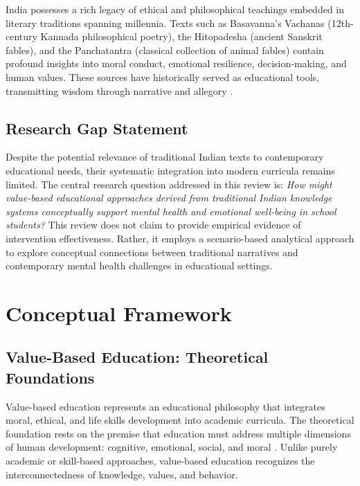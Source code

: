 \documentclass[12pt,a4paper,twocolumn]{article}
\begin{document}
India possesses a rich legacy of ethical and philosophical teachings embedded in literary traditions spanning millennia. Texts such as Basavanna's Vachanas (12th-century Kannada philosophical poetry), the Hitopadesha (ancient Sanskrit fables), and the Panchatantra (classical collection of animal fables) contain profound insights into moral conduct, emotional resilience, decision-making, and human values. These sources have historically served as educational tools, transmitting wisdom through narrative and allegory \citep{Hiremath1996, Mitra2015, Mukherjee2012}.

\subsection{Research Gap Statement}

Despite the potential relevance of traditional Indian texts to contemporary educational needs, their systematic integration into modern curricula remains limited. The central research question addressed in this review is: \textit{How might value-based educational approaches derived from traditional Indian knowledge systems conceptually support mental health and emotional well-being in school students?} This review does not claim to provide empirical evidence of intervention effectiveness. Rather, it employs a scenario-based analytical approach to explore conceptual connections between traditional narratives and contemporary mental health challenges in educational settings.

\section{Conceptual Framework}

\subsection{Value-Based Education: Theoretical Foundations}

Value-based education represents an educational philosophy that integrates moral, ethical, and life skills development into academic curricula. The theoretical foundation rests on the premise that education must address multiple dimensions of human development: cognitive, emotional, social, and moral \citep{Narvaez2006}. Unlike purely academic or skill-based approaches, value-based education recognizes the interconnectedness of knowledge, values, and behavior.
\end{document}
